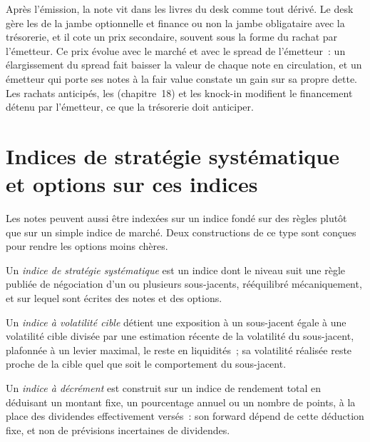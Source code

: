 Après l'émission, la note vit dans les livres du desk comme tout dérivé. Le desk gère les  de la jambe optionnelle et finance ou non la
jambe obligataire avec la trésorerie, et il cote un prix secondaire, souvent sous la forme du rachat par l'émetteur. Ce prix évolue avec le marché et avec le
spread de l'émetteur~: un élargissement du spread fait baisser la valeur de chaque note en circulation, et un émetteur qui porte ses notes à la fair value
constate un gain sur sa propre dette. Les rachats anticipés, les  (chapitre~18) et les knock-in modifient le financement détenu par l'émetteur, ce que la trésorerie doit anticiper.

\section{Indices de stratégie systématique et options sur ces indices}

Les notes peuvent aussi être indexées sur un indice fondé sur des règles plutôt que sur un simple indice de marché. Deux constructions de ce type sont conçues pour rendre les options
moins chères.

\begin{definition}\label{def:dv:the-structured-products-business:ssi}
Un \emph{indice de stratégie systématique} est un indice dont le niveau suit une règle publiée de négociation d'un ou
plusieurs sous-jacents, rééquilibré mécaniquement, et sur lequel sont écrites des notes et des options.
\end{definition}

\begin{definition}\label{def:dv:the-structured-products-business:vt}
Un \emph{indice à volatilité cible} détient une exposition à un sous-jacent égale à une volatilité cible divisée
par une estimation récente de la volatilité du sous-jacent, plafonnée à un levier maximal, le reste en liquidités~; sa volatilité réalisée reste
proche de la cible quel que soit le comportement du sous-jacent.
\end{definition}

\begin{definition}\label{def:dv:the-structured-products-business:decrement}
Un \emph{indice à décrément} est construit sur un indice de rendement total en déduisant un montant fixe, un pourcentage annuel ou un
nombre de points, à la place des dividendes effectivement versés~: son forward dépend de cette déduction fixe, et non de prévisions
incertaines de dividendes.
\end{definition}

